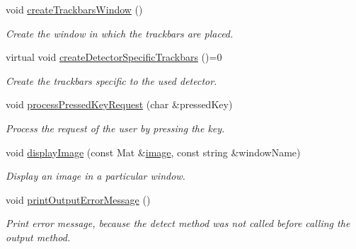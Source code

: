 \begin{DoxyCompactItemize}
void \hyperlink{classmultiscale_1_1analysis_1_1Detector_afdf4c74184888dbd112d0f1cec3776cd}{create\-Trackbars\-Window} ()
\begin{DoxyCompactList}\small\item\em Create the window in which the trackbars are placed. \end{DoxyCompactList}\item 
virtual void \hyperlink{classmultiscale_1_1analysis_1_1Detector_a930ad07f5b8d9f21e6758341f71ae31a}{create\-Detector\-Specific\-Trackbars} ()=0
\begin{DoxyCompactList}\small\item\em Create the trackbars specific to the used detector. \end{DoxyCompactList}\item 
void \hyperlink{classmultiscale_1_1analysis_1_1Detector_a72265d36d3fa22aa3c141eb4001fe2fe}{process\-Pressed\-Key\-Request} (char \&pressed\-Key)
\begin{DoxyCompactList}\small\item\em Process the request of the user by pressing the key. \end{DoxyCompactList}\item 
void \hyperlink{classmultiscale_1_1analysis_1_1Detector_ae68f8f87cc1e4e1cd22cee1e3604ef4b}{display\-Image} (const Mat \&\hyperlink{classmultiscale_1_1analysis_1_1Detector_a523830a6cfe409694ce8327c3c736fbd}{image}, const string \&window\-Name)
\begin{DoxyCompactList}\small\item\em Display an image in a particular window. \end{DoxyCompactList}\item 
void \hyperlink{classmultiscale_1_1analysis_1_1Detector_a9150f3fc7945405da34761a4250b7c79}{print\-Output\-Error\-Message} ()
\begin{DoxyCompactList}\small\item\em Print error message, because the detect method was not called before calling the output method. \end{DoxyCompactList}\end{DoxyCompactItemize}

